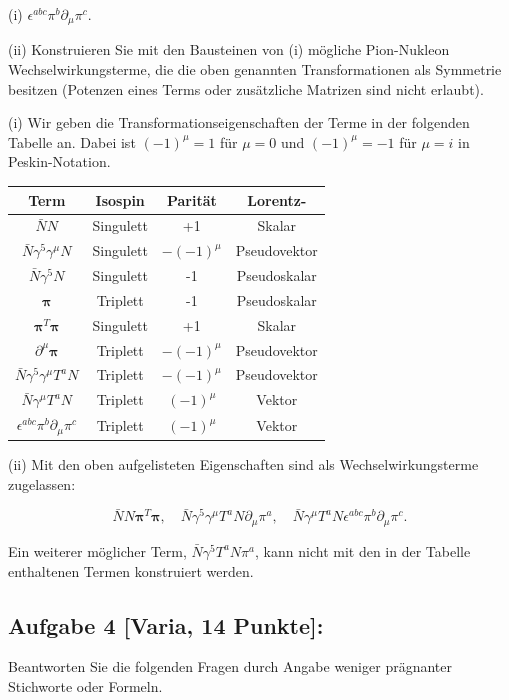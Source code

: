 \documentclass[10pt, letterpaper]{article}
\begin{document}
(i) $\epsilon^{a b c} \pi^b \partial_\mu \pi^c$.

(ii) Konstruieren Sie mit den Bausteinen von (i) mögliche Pion-Nukleon Wechselwirkungsterme, die die oben genannten Transformationen als Symmetrie besitzen (Potenzen eines Terms oder zusätzliche Matrizen sind nicht erlaubt).


(i) Wir geben die Transformationseigenschaften der Terme in der folgenden Tabelle an. Dabei ist $(-1)^\mu=1$ für $\mu=0$ und $(-1)^\mu=-1$ für $\mu=i$ in Peskin-Notation.

\begin{tabular}{|c|c|c|c|}
\hline Term & Isospin & Parität & Lorentz- \\
\hline $\bar{N} N$ & Singulett & +1 & Skalar \\
\hline $\bar{N} \gamma^5 \gamma^\mu N$ & Singulett & $-(-1)^\mu$ & Pseudovektor \\
\hline $\bar{N} \gamma^5 N$ & Singulett & -1 & Pseudoskalar \\
\hline $\boldsymbol{\pi}$ & Triplett & -1 & Pseudoskalar \\
\hline $\boldsymbol{\pi}^T \boldsymbol{\pi}$ & Singulett & +1 & Skalar \\
\hline$\partial^\mu \boldsymbol{\pi}$ & Triplett & $-(-1)^\mu$ & Pseudovektor \\
\hline $\bar{N} \gamma^5 \gamma^\mu T^a N$ & Triplett & $-(-1)^\mu$ & Pseudovektor \\
\hline $\bar{N} \gamma^\mu T^a N$ & Triplett & $(-1)^\mu$ & Vektor \\
\hline$\epsilon^{a b c} \pi^b \partial_\mu \pi^c$ & Triplett & $(-1)^\mu$ & Vektor \\
\hline
\end{tabular}

(ii) Mit den oben aufgelisteten Eigenschaften sind als Wechselwirkungsterme zugelassen:

$$
\bar{N} N \boldsymbol{\pi}^T \boldsymbol{\pi}, \quad \bar{N} \gamma^5 \gamma^\mu T^a N \partial_\mu \pi^a, \quad \bar{N} \gamma^\mu T^a N \epsilon^{a b c} \pi^b \partial_\mu \pi^c .
$$


Ein weiterer möglicher Term, $\bar{N} \gamma^5 T^a N \pi^a$, kann nicht mit den in der Tabelle enthaltenen Termen konstruiert werden.


\subsection{Aufgabe 4 [Varia, 14 Punkte]:}
Beantworten Sie die folgenden Fragen durch Angabe weniger prägnanter Stichworte oder Formeln.
\end{document}
